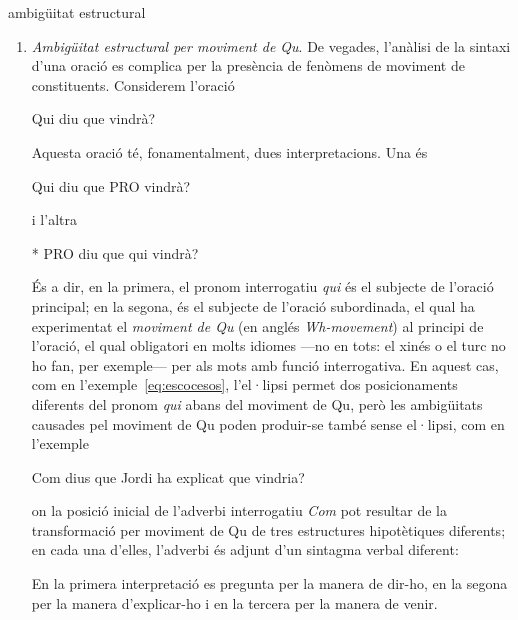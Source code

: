 \begin{persabermes}{ambigüitat estructural}
\begin{enumerate}
  \item \emph{Ambigüitat estructural per moviment de Qu}. De vegades,
    l'anàlisi de la sintaxi d'una oració es complica per la presència
    de fenòmens de moviment de constituents. Considerem l'oració
    \begin{example}
      Qui diu que vindrà?
    \end{example}
    Aquesta oració té, fonamentalment, dues interpretacions. Una és
    \begin{example}
      Qui diu que PRO vindrà?
    \end{example}
    i l'altra
  \begin{example}
    * PRO diu que qui vindrà?
  \end{example}
  És a dir, en la primera, el pronom interrogatiu \emph{qui} és el
  subjecte de l'oració principal; en la segona, és el subjecte de
  l'oració subordinada, el qual ha experimentat el \emph{moviment de
    Qu} (en anglés \emph{Wh-movement}) al principi de l'oració, el
  qual obligatori en molts idiomes ---no en tots: el xinés o el turc
  no ho fan, per exemple--- per als mots amb funció interrogativa. En
  aquest cas, com en l'exemple~\ref{eq:escocesos}, l'el·lipsi permet
  dos posicionaments diferents del pronom \emph{qui} abans del
  moviment de Qu, però les ambigüitats causades pel moviment de Qu
  poden produir-se també sense el·lipsi, com en l'exemple
  \begin{exemple}
    Com dius que Jordi ha explicat que vindria?
  \end{exemple}
  on la posició inicial de l'adverbi interrogatiu \emph{Com} pot
  resultar de la transformació per moviment de Qu de tres estructures
  hipotètiques diferents; en cada una d'elles, l'adverbi és adjunt
  d'un sintagma verbal diferent:
  En la primera interpretació es pregunta per la manera de dir-ho, en
  la segona per la manera d'explicar-ho i en la tercera per la manera
  de venir.
  

\end{enumerate}
\end{persabermes}
